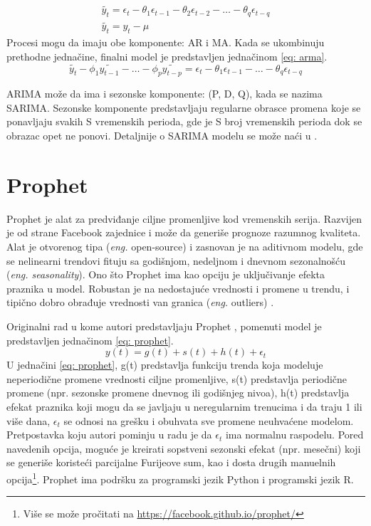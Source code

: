 \documentclass[12pt,oneside]{memoir}
\begin{document}
\begin{equation}
\begin{gathered}
\label{eq: ma_q}
\tilde{y_t} = \epsilon_t - \theta_1\epsilon_{t-1} - \theta_2\epsilon_{t-2} - \dots - \theta_q\epsilon_{t-q}  \\
\tilde{y_t} = y_t - \mu
\end{gathered}
\end{equation}
Procesi mogu da imaju obe komponente: AR i MA. Kada se ukombinuju prethodne jednačine, finalni model je predstavljen jednačinom \ref{eq: arma}.
\begin{equation}
\label{eq: arma}
\tilde{y_t} - \phi_1\tilde{y_{t-1}} - \dots - \phi_p\tilde{y_{t-p}} = \epsilon_t - \theta_1\epsilon_{t-1} - \dots - \theta_q\epsilon_{t-q}
\end{equation}

ARIMA može da ima i sezonske komponente: (P, D, Q), kada se nazima SARIMA. Sezonske komponente predstavljaju regularne obrasce promena koje se ponavljaju svakih S vremenskih perioda, gde je S broj vremenskih perioda dok se obrazac opet ne ponovi. Detaljnije o SARIMA modelu se može naći u \cite{hyndman2018forecasting}.

\section{Prophet}
Prophet je alat za predviđanje ciljne promenljive kod vremenskih serija. Razvijen je od strane Facebook zajednice \cite{prophet} i može da generiše prognoze razumnog kvaliteta. Alat je otvorenog tipa (\textit{eng.} open-source) i zasnovan je na aditivnom modelu, gde se nelinearni trendovi fituju sa godišnjom, nedeljnom i dnevnom sezonalnošću (\textit{eng. seasonality}). Ono što Prophet ima kao opciju je uključivanje efekta praznika u model. Robustan je na nedostajuće vrednosti i promene u trendu, i tipično dobro obrađuje vrednosti van granica (\textit{eng.} outliers) \cite{zunic2020application}.

Originalni rad u kome autori predstavljaju Prophet \cite{taylor2018forecasting}, pomenuti model je predstavljen jednačinom \ref{eq: prophet}.
\begin{equation}
\label{eq: prophet}
y(t) = g(t) + s(t) + h(t) + \epsilon_t
\end{equation}
U jednačini \ref{eq: prophet}, g(t) predstavlja funkciju trenda koja modeluje neperiodične promene vrednosti ciljne promenljive, s(t) predstavlja periodične promene (npr. sezonske promene dnevnog ili godišnjeg nivoa), h(t) predstavlja efekat praznika koji mogu da se javljaju u neregularnim trenucima i da traju 1 ili više dana, $\epsilon_t$ se odnosi na grešku i obuhvata sve promene neuhvaćene modelom. Pretpostavka koju autori pominju u radu je da $\epsilon_t$ ima normalnu raspodelu. Pored navedenih opcija, moguće je kreirati sopstveni sezonski efekat (npr. mesečni) koji se generiše koristeći parcijalne Furijeove sum, kao i dosta drugih manuelnih opcija\footnote{Više se može pročitati na \url{https://facebook.github.io/prophet/}}. Prophet ima podršku za programski jezik Python i programski jezik R.
\end{document}

